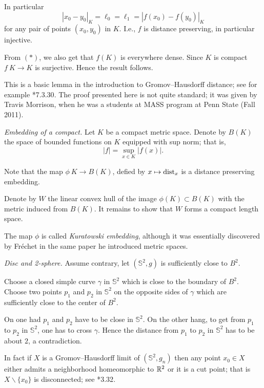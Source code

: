 In particular 
\[|x_0-y_0|_K=\ell_0=\ell_1=|f(x_0)-f(y_0)|_K\]
for any pair of points $(x_0,y_0)$ in $K$.
I.e., $f$ is distance preserving, in particular injective.

From $({*})$, we also get that $f(K)$ is everywhere dense.
Since $K$ is compact $f\:K\to K$ is surjective. Hence the result follows.

This is a basic lemma in the introduction to Gromov--Hausdorff distance;
see for example \cite{bbi}*{7.3.30}.
The proof presented here is not quite standard;
it was given by Travis Morrison, when he was a students at MASS program at Penn State (Fall 2011).



\textit{Embedding of a compact.}
Let $K$ be a compact metric space.
Denote by $B(K)$ the space of bounded functions on $K$
equipped with sup norm; 
that is, 
\[|f|=\sup_{x\in K}|f(x)|.\]

Note that the map $\phi\:K\to B(K)$, defied by $x\mapsto \operatorname{\rm dist}_x$
is a distance preserving embedding.

Denote by $W$ the linear convex hull of the image $\phi(K)\subset B(K)$ with the metric induced from $B(K)$.
It remains to show that $W$ forms a compact length space.

The map $\phi$ is called \emph{Kuratowski embedding},
although it was essentially discovered by Fr\'echet in the same paper he introduced metric spaces.



\textit{Disc and 2-sphere.}
Assume contrary, let $(\mathbb{S}^2,g)$ is sufficiently close to $B^2$.

Choose a closed simple curve $\gamma$ in $\mathbb{S}^2$ which is close to the boundary of $B^2$.
Choose two points $p_1$ and $p_2$ in $\mathbb{S}^2$ 
on the opposite sides of $\gamma$ which are sufficiently close to the center of $B^2$.

On one had $p_1$ and $p_2$ have to be close in $\mathbb{S}^2$.
On the other hang, to get from $p_1$ to $p_2$ in $\mathbb{S}^2$,
one has to cross $\gamma$.
Hence the distance from $p_1$ to $p_2$ in $\mathbb{S}^2$ has to be about $2$,
a contradiction.

In fact if $X$ is a Gromov--Hausdorff limit of $(\mathbb{S}^2,g_n)$
then any point $x_0\in X$ either admits a neighborhood homeomorphic to $\mathbb{R}^2$ or it is a cut point;
that is $X\backslash\{x_0\}$ is disconnected; see \cite{gromov-MetStr}*{3.32}.

